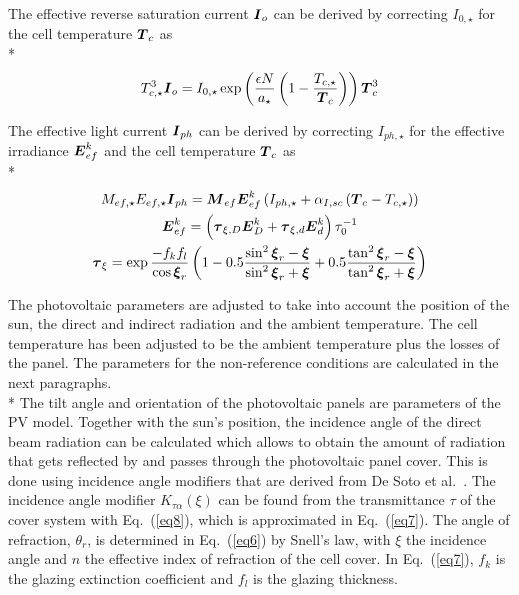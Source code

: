 The effective reverse saturation current $\boldsymbol{I}_{o}$ can be derived by correcting $I_{0,\star}$ for the cell temperature $\boldsymbol{T}_{c}$ as\\*
\begin{equation}
T_{c,\star}^{3} \boldsymbol{I}_{o} = I_{0,\star} \exp \left( \frac{\epsilon N}{a_{\star}}  \left(1-\frac{T_{c,\star}}{\boldsymbol{T}_{c}} \right) \right) \boldsymbol{T}_{c}^{3} 
\end{equation}

The effective light current $\boldsymbol{I}_{ph}$ can be derived by correcting $I_{ph,\star}$ for the effective irradiance $\boldsymbol{E}_{ef}^{k}$ and the cell temperature $\boldsymbol{T}_{c}$ as\\*
\begin{gather}
M_{ef,\star} E_{ef,\star} \boldsymbol{I}_{ph} = \boldsymbol{M}_{ef} \boldsymbol{E}_{ef}^{k} \left( I_{ph,\star} + \alpha_{I,sc} \left(\boldsymbol{T}_{c} - T_{c,\star}\right) \right) \\
\boldsymbol{E}_{ef}^{k} = \left( \boldsymbol{\tau}_{\xi,D} \boldsymbol{E}_{D}^{k} + \boldsymbol{\tau}_{\xi,d} \boldsymbol{E}_{d}^{k} \right) \tau_{0}^{-1} \\
\boldsymbol{\tau}_{\xi} =  \exp \frac{-f_{k} f_{l}}{\cos \boldsymbol{\xi}_{r}} \left(1 - 0.5 \frac{\sin^{2}\boldsymbol{\xi}_{r} - \boldsymbol{\xi}}{\sin^{2}\boldsymbol{\xi}_{r} + \boldsymbol{\xi}} + 0.5 \frac{\tan^{2}\boldsymbol{\xi}_{r} - \boldsymbol{\xi}}{\tan^{2}\boldsymbol{\xi}_{r} + \boldsymbol{\xi}}  \right) \label{eq7}
\end{gather}

The photovoltaic parameters are adjusted to take into account the position of the sun, the direct and indirect radiation and the ambient temperature. The cell temperature has been adjusted to be the ambient temperature plus the losses of the panel. The parameters for the non-reference conditions are calculated in the next paragraphs.\\*
%
The tilt angle and orientation of the photovoltaic panels are parameters of the PV model. Together with the sun's position, the incidence angle of the direct beam radiation can be calculated which allows to obtain the amount of radiation that gets reflected by and passes through the photovoltaic panel cover. This is done using incidence angle modifiers that are derived from De Soto et al.~\cite{desoto}. The incidence angle modifier $K_{\tau \alpha}(\xi)$ can be found from the transmittance $\tau$ of the cover system with Eq.~(\ref{eq8}), which is approximated in Eq.~(\ref{eq7}). The angle of refraction, $\theta _{r}$, is determined in Eq.~(\ref{eq6}) by Snell's law, with $\xi$ the incidence angle and $n$ the effective index of refraction of the cell cover. In Eq.~(\ref{eq7}), $f_k$ is the glazing extinction coefficient and $f_l$ is the glazing thickness. 

